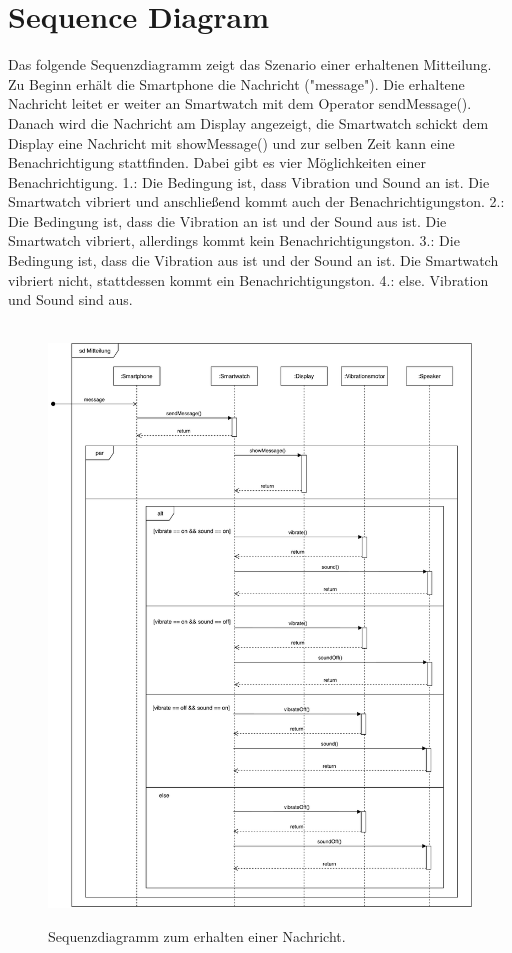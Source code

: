 

\section{Sequence Diagram}

Das folgende Sequenzdiagramm zeigt das Szenario einer erhaltenen Mitteilung. Zu Beginn erhält die Smartphone die Nachricht ("message"). Die erhaltene Nachricht leitet er weiter an Smartwatch mit dem Operator sendMessage(). Danach wird die Nachricht am Display angezeigt, die Smartwatch schickt dem Display eine Nachricht mit showMessage() und zur selben Zeit kann eine Benachrichtigung stattfinden. Dabei gibt es vier Möglichkeiten einer Benachrichtigung.
1.: Die Bedingung ist, dass Vibration und Sound an ist. Die Smartwatch vibriert und anschließend kommt auch der Benachrichtigungston.
2.: Die Bedingung ist, dass die Vibration an ist und der Sound aus ist. Die Smartwatch vibriert, allerdings kommt kein Benachrichtigungston.
3.: Die Bedingung ist, dass die Vibration aus ist und der Sound an ist. Die Smartwatch vibriert nicht, stattdessen kommt ein Benachrichtigungston.
4.: else. Vibration und Sound sind aus.

\begin{figure}[h]
\centering\
\includegraphics[width=\textwidth]{img/seqMessage}
\caption{Sequenzdiagramm zum erhalten einer Nachricht.}\label{fig:seqMessage}
\end{figure}
